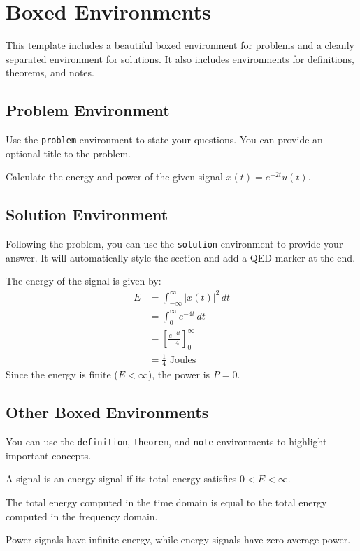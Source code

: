 \section{Boxed Environments}

This template includes a beautiful boxed environment for problems and a cleanly separated environment for solutions. It also includes environments for definitions, theorems, and notes.

\subsection{Problem Environment}
Use the \texttt{problem} environment to state your questions. You can provide an optional title to the problem. 

\begin{problem}
Calculate the energy and power of the given signal $x(t) = e^{-2t}u(t)$.
\end{problem}

\subsection{Solution Environment}
Following the problem, you can use the \texttt{solution} environment to provide your answer. It will automatically style the section and add a QED marker at the end.

\begin{solution}
The energy of the signal is given by:
\begin{align*}
E &= \int_{-\infty}^{\infty} |x(t)|^2 \,dt \\
  &= \int_{0}^{\infty} e^{-4t} \,dt \\
  &= \left[ \frac{e^{-4t}}{-4} \right]_0^\infty \\
  &= \frac{1}{4} \text{ Joules}
\end{align*}
Since the energy is finite ($E < \infty$), the power is $P = 0$.
\end{solution}

\subsection{Other Boxed Environments}
You can use the \texttt{definition}, \texttt{theorem}, and \texttt{note} environments to highlight important concepts.

\begin{definition}
A signal is an energy signal if its total energy satisfies $0 < E < \infty$.
\end{definition}

\begin{theorem}
The total energy computed in the time domain is equal to the total energy computed in the frequency domain.
\end{theorem}

\begin{note}[Important]
Power signals have infinite energy, while energy signals have zero average power.
\end{note}

\newpage